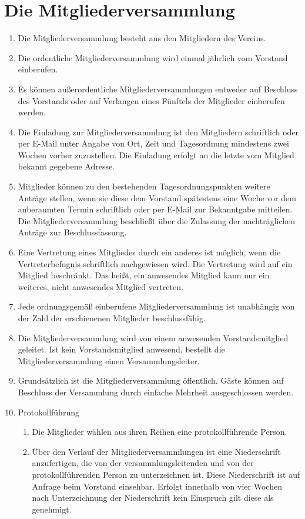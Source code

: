 \documentclass[a4paper, 12pt]{scrartcl}
\begin{document}
\section{Die Mitgliederversammlung}
\label{die-mv}
\begin{enumerate}
	\item Die Mitgliederversammlung besteht aus den Mitgliedern des Vereins.
	\item Die ordentliche Mitgliederversammlung wird einmal jährlich vom   Vorstand einberufen.
	\item Es können außerordentliche Mitgliederversammlungen entweder auf Beschluss des Vorstands oder auf Verlangen eines Fünftels der Mitglieder einberufen werden.
	\item \label{mv-einladung} Die Einladung zur Mitgliederversammlung ist den Mitgliedern schriftlich oder per E-Mail unter Angabe von Ort, Zeit und Tagesordnung mindestens zwei Wochen vorher zuzustellen. Die Einladung erfolgt an die letzte vom Mitglied bekannt gegebene Adresse.
	\item \label{mv-nachtrag} Mitglieder können zu den bestehenden Tagesordnungspunkten weitere Anträge stellen, wenn sie diese dem Vorstand spätestens eine Woche vor dem anberaumten Termin schriftlich oder per E-Mail zur Bekanntgabe mitteilen. Die Mitgliederversammlung beschließt über die Zulassung der nachträglichen Anträge zur Beschlussfassung.
	\item Eine Vertretung eines Mitgliedes durch ein anderes ist möglich, wenn die Vertreterbefugnis schriftlich nachgewiesen wird. Die Vertretung wird auf ein Mitglied beschränkt. Das heißt, ein anwesendes Mitglied kann nur ein weiteres, nicht anwesendes Mitglied vertreten.
	\item Jede ordnungsgemäß einberufene Mitgliederversammlung ist unabhängig von der Zahl der erschienenen Mitglieder beschlussfähig.
	\item Die Mitgliederversammlung wird von einem anwesenden Vorstandsmitglied geleitet. Ist kein Vorstandsmitglied anwesend, bestellt die Mitgliederversammlung einen Versammlungsleiter.
	\item Grundsätzlich ist die Mitgliederversammlung öffentlich. Gäste können auf Beschluss der Versammlung durch einfache Mehrheit ausgeschlossen werden.
	\item{Protokollführung}
		\begin{enumerate}
			\item Die Mitglieder wählen aus ihren Reihen eine protokollführende Person.
			\item Über den Verlauf der Mitgliederversammlungen ist eine Niederschrift anzufertigen, die von der versammlungsleitenden und von der protokollführenden Person zu unterzeichnen ist. Diese Niederschrift ist auf Anfrage beim Vorstand einsehbar. Erfolgt innerhalb von vier Wochen nach Unterzeichnung der Niederschrift kein Einspruch gilt diese als genehmigt.

\end{enumerate}
\end{enumerate}
\end{document}
